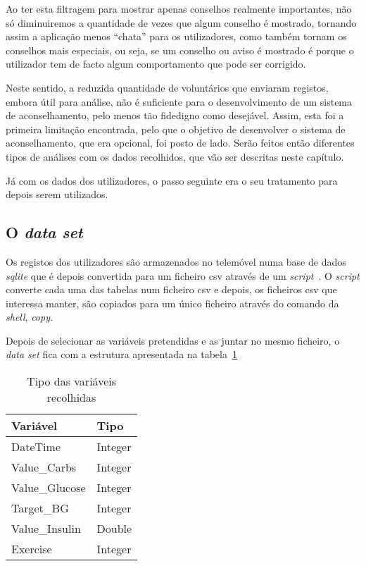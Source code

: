 Ao ter esta filtragem para mostrar apenas conselhos realmente importantes, não só diminuiremos a quantidade de vezes que algum conselho é mostrado, tornando assim a aplicação menos ``chata'' para os utilizadores, como também tornam os conselhos mais especiais, ou seja, se um conselho ou aviso é mostrado é porque o utilizador tem de facto algum comportamento que pode ser corrigido.

Neste sentido, a reduzida quantidade de voluntários que enviaram registos, embora útil para análise, não é suficiente para o desenvolvimento de um sistema de aconselhamento, pelo menos tão fidedigno como desejável. Assim, esta foi a primeira limitação encontrada, pelo que o objetivo de desenvolver o sistema de aconselhamento, que era opcional, foi posto de lado. Serão feitos então diferentes tipos de análises com os dados recolhidos, que vão ser descritas neste capítulo.

Já com os dados dos utilizadores, o passo seguinte era o seu tratamento para depois serem utilizados.


\subsection{O \textit{data set}}

Os registos dos utilizadores são armazenados no telemóvel numa base de dados \textit{sqlite} que é depois convertida para um ficheiro csv através de um \textit{script}~\cite{script}. O \textit{script} converte cada uma das tabelas num ficheiro csv e depois, os ficheiros csv que interessa manter, são copiados para um único ficheiro através do comando da \textit{shell}, \textit{copy}.

Depois de selecionar as variáveis pretendidas e as juntar no mesmo ficheiro, o \textit{data set} fica com a estrutura apresentada na tabela~\ref{tab:tipos}
 

\begin{table}[H]
\centering
\begin{tabular}{|l|l|}
\hline
\rowcolor[HTML]{C0C0C0} 
{\color[HTML]{000000} \textbf{Variável}} & {\color[HTML]{000000} \textbf{Tipo}} \\ \hline
\rowcolor[HTML]{FFFFFF} 
DateTime                                 & Integer                              \\ \hline
\rowcolor[HTML]{FFFFFF} 
Value\_Carbs                             & Integer                              \\ \hline
\rowcolor[HTML]{FFFFFF} 
Value\_Glucose                           & Integer                              \\ \hline
\rowcolor[HTML]{FFFFFF} 
Target\_BG                               & Integer                              \\ \hline
\rowcolor[HTML]{FFFFFF} 
Value\_Insulin                           & Double                               \\ \hline
Exercise                                 & Integer                              \\ \hline
\end{tabular}

\caption{Tipo das variáveis recolhidas}
\label{tab:tipos}
\end{table}

